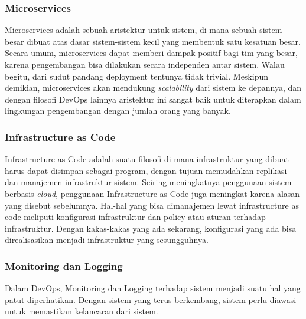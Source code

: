 \subsubsection{Microservices}
Microservices adalah sebuah aristektur untuk sistem, di mana sebuah sistem besar dibuat atas dasar sistem-sistem kecil yang membentuk satu kesatuan besar.
Secara umum, microservices dapat memberi dampak positif bagi tim yang besar, karena pengembangan bisa dilakukan secara independen antar sistem.
Walau begitu, dari sudut pandang deployment tentunya tidak trivial.
Meskipun demikian, microservices akan mendukung \textit{scalability} dari sistem ke depannya, dan dengan filosofi DevOps lainnya aristektur ini sangat baik untuk diterapkan dalam lingkungan pengembangan dengan jumlah orang yang banyak. 

\subsubsection{Infrastructure as Code}
Infrastructure as Code adalah suatu filosofi di mana infrastruktur yang dibuat harus dapat disimpan sebagai program, dengan tujuan memudahkan replikasi dan manajemen infrastruktur sistem.
Seiring meningkatnya penggunaan sistem berbasis \textit{cloud}, penggunaan Infrastructure as Code juga meningkat karena alasan yang disebut sebelumnya.
Hal-hal yang bisa dimanajemen lewat infrastructure as code meliputi konfigurasi infrastruktur dan policy atau aturan terhadap infrastruktur.
Dengan kakas-kakas yang ada sekarang, konfigurasi yang ada bisa direalisasikan menjadi infrastruktur yang sesungguhnya.

\subsubsection{Monitoring dan Logging}
Dalam DevOps, Monitoring dan Logging terhadap sistem menjadi suatu hal yang patut diperhatikan.
Dengan sistem yang terus berkembang, sistem perlu diawasi untuk memastikan kelancaran dari sistem.
 
